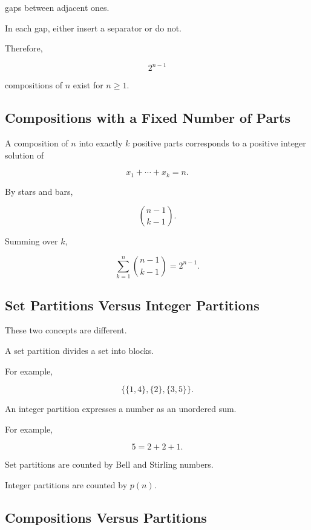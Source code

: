 gaps between adjacent ones.

In each gap, either insert a separator or do not.

Therefore,

\[
\boxed{
2^{n-1}
}
\]

compositions of \(n\) exist for \(n\geq1\).

\subsection{Compositions with a Fixed Number of Parts}
\label{subsec:compositions-fixed-parts}

A composition of \(n\) into exactly \(k\) positive parts corresponds to
a positive integer solution of

\[
x_1+\cdots+x_k=n.
\]

By stars and bars,

\[
\boxed{
\binom{n-1}{k-1}.
}
\]

Summing over \(k\),

\[
\sum_{k=1}^{n}
\binom{n-1}{k-1}
=
2^{n-1}.
\]

\subsection{Set Partitions Versus Integer Partitions}
\label{subsec:set-versus-integer-partitions}

These two concepts are different.

A set partition divides a set into blocks.

For example,

\[
\{\{1,4\},\{2\},\{3,5\}\}.
\]

An integer partition expresses a number as an unordered sum.

For example,

\[
5=2+2+1.
\]

Set partitions are counted by Bell and Stirling numbers.

Integer partitions are counted by \(p(n)\).

\subsection{Compositions Versus Partitions}
\label{subsec:compositions-versus-partitions}

